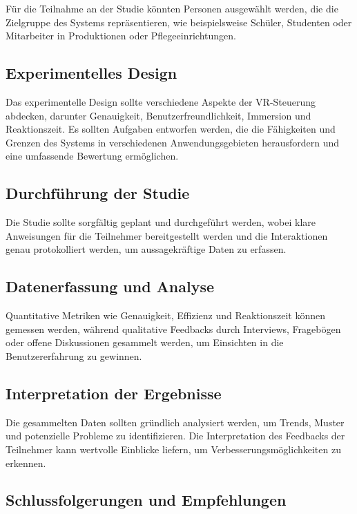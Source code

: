 Für die Teilnahme an der Studie könnten Personen ausgewählt werden, die die Zielgruppe des Systems repräsentieren, wie beispielsweise Schüler, Studenten oder Mitarbeiter in Produktionen oder Pflegeeinrichtungen.

\subsection{Experimentelles Design}

Das experimentelle Design sollte verschiedene Aspekte der VR-Steuerung abdecken, darunter Genauigkeit, Benutzerfreundlichkeit, Immersion und Reaktionszeit. Es sollten Aufgaben entworfen werden, die die Fähigkeiten und Grenzen des Systems in verschiedenen Anwendungsgebieten herausfordern und eine umfassende Bewertung ermöglichen.

\subsection{Durchführung der Studie}

Die Studie sollte sorgfältig geplant und durchgeführt werden, wobei klare Anweisungen für die Teilnehmer bereitgestellt werden und die Interaktionen genau protokolliert werden, um aussagekräftige Daten zu erfassen.

\subsection{Datenerfassung und Analyse}

Quantitative Metriken wie Genauigkeit, Effizienz und Reaktionszeit können gemessen werden, während qualitative Feedbacks durch Interviews, Fragebögen oder offene Diskussionen gesammelt werden, um Einsichten in die Benutzererfahrung zu gewinnen.

\subsection{Interpretation der Ergebnisse}

Die gesammelten Daten sollten gründlich analysiert werden, um Trends, Muster und potenzielle Probleme zu identifizieren. Die Interpretation des Feedbacks der Teilnehmer kann wertvolle Einblicke liefern, um Verbesserungsmöglichkeiten zu erkennen.

\subsection{Schlussfolgerungen und Empfehlungen}

